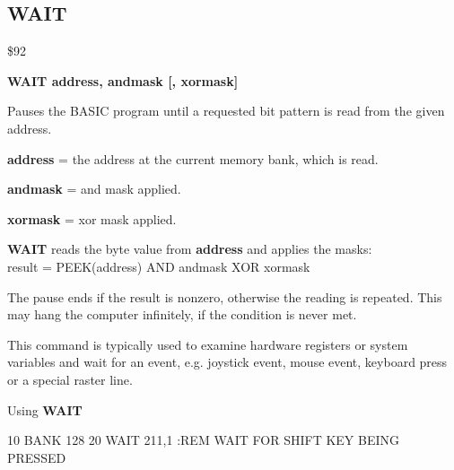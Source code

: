 
\newpage
\subsection{WAIT}
\begin{description}[leftmargin=3cm,style=nextline]
\item [Token:] \$92
\item [Format:] {\bf WAIT address, andmask [, xormask]}
\item [Usage:] Pauses the BASIC program until a requested
               bit pattern is read from the given address.

               {\bf address} = the address at the current memory
               bank, which is read.

               {\bf andmask} = and mask applied.

               {\bf xormask} = xor mask applied.

               {\bf WAIT} reads the byte value from {\bf address}
               and applies the masks: \\
               result = PEEK(address) AND andmask XOR xormask

               The pause ends if the result is nonzero, otherwise
               the reading is repeated. This may hang the computer
               infinitely, if the condition is never met.

\item [Remarks:] This command is typically used to examine hardware
               registers or system variables
               and wait for an event, e.g. joystick event,
               mouse event, keyboard press or a special raster line.

\item [Example:] Using {\bf WAIT}
\begin{screenoutput}
10 BANK 128
20 WAIT 211,1            :REM WAIT FOR SHIFT KEY BEING PRESSED
\end{screenoutput}
\end{description}


\newpage
